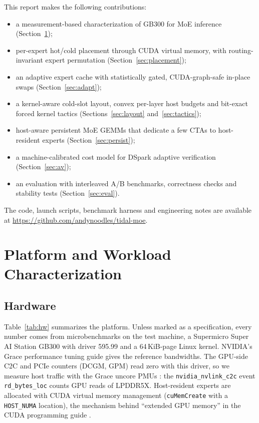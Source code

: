 \documentclass{article}
\newcommand{\tabref}[1]{Table~\ref{#1}}
\newcommand{\secref}[1]{Section~\ref{#1}}
\newcommand{\repo}{\url{https://github.com/andynoodles/tidal-moe}}
\begin{document}
This report makes the following contributions:
\begin{itemize}
  \item a measurement-based characterization of GB300 for MoE inference (\secref{sec:char});
  \item per-expert hot/cold placement through CUDA virtual memory, with routing-invariant expert permutation
        (\secref{sec:placement});
  \item an adaptive expert cache with statistically gated, CUDA-graph-safe in-place swaps (\secref{sec:adapt});
  \item a kernel-aware cold-slot layout, convex per-layer host budgets and bit-exact forced kernel tactics
        (Sections~\ref{sec:layout} and~\ref{sec:tactics});
  \item host-aware persistent MoE GEMMs that dedicate a few CTAs to host-resident experts (\secref{sec:persist});
  \item a machine-calibrated cost model for DSpark adaptive verification (\secref{sec:av});
  \item an evaluation with interleaved A/B benchmarks, correctness checks and stability tests (\secref{sec:eval}).
\end{itemize}
The code, launch scripts, benchmark harness and engineering notes are available at \repo.

\section{Platform and Workload Characterization}\label{sec:char}

\subsection{Hardware}
\tabref{tab:hw} summarizes the platform. Unless marked as a specification, every number comes from microbenchmarks on
the test machine, a Supermicro Super AI Station GB300 with driver 595.99 and a 64\,KiB-page Linux kernel. NVIDIA's Grace
performance tuning guide \citep{gracetuning} gives the reference bandwidths. The GPU-side C2C and PCIe counters (DCGM,
GPM) read zero with this driver, so we measure host traffic with the Grace uncore PMUs \citep{gracepmu}: the
\texttt{nvidia\_nvlink\_c2c} event \texttt{rd\_bytes\_loc} counts GPU reads of LPDDR5X. Host-resident experts are
allocated with CUDA virtual memory management (\texttt{cuMemCreate} with a \texttt{HOST\_NUMA} location), the mechanism
behind ``extended GPU memory'' in the CUDA programming guide \citep{cudaegm}.
\end{document}
